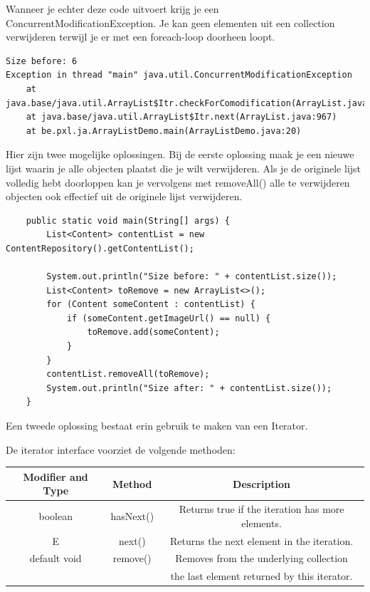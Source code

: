 \documentclass{tstextbook}
\begin{document}
Wanneer je echter deze code uitvoert krijg je een ConcurrentModificationException. Je kan geen elementen uit een collection verwijderen terwijl je er met een foreach-loop doorheen loopt.

\begin{verbatim}
Size before: 6
Exception in thread "main" java.util.ConcurrentModificationException
	at java.base/java.util.ArrayList$Itr.checkForComodification(ArrayList.java:1013)
	at java.base/java.util.ArrayList$Itr.next(ArrayList.java:967)
	at be.pxl.ja.ArrayListDemo.main(ArrayListDemo.java:20)
\end{verbatim}

Hier zijn twee mogelijke oplossingen. Bij de eerste oplossing maak je een nieuwe lijst waarin je alle objecten plaatst die je wilt verwijderen. Als je de originele lijst volledig hebt doorloppen kan je vervolgens met removeAll() alle te verwijderen objecten ook effectief uit de originele lijst verwijderen.

\begin{lstlisting}
	public static void main(String[] args) {
		List<Content> contentList = new ContentRepository().getContentList();

		System.out.println("Size before: " + contentList.size());
		List<Content> toRemove = new ArrayList<>();
		for (Content someContent : contentList) {
			if (someContent.getImageUrl() == null) {
				toRemove.add(someContent);
			}
		}
		contentList.removeAll(toRemove);
		System.out.println("Size after: " + contentList.size());
	}
\end{lstlisting}

Een tweede oplossing bestaat erin gebruik te maken van een Iterator.

De iterator interface voorziet de volgende methoden:

\vspace{2mm}
\begin{tabular}{| c | c |  c |} 
 \hline
Modifier and Type & Method	& Description \\
\hline
boolean & 	hasNext()	 &  Returns true if the iteration has more elements.\\
\hline
E & next() & Returns the next element in the iteration.\\
\hline
default void	& remove() & Removes from the underlying collection \\
 & & the last element returned by this iterator. \\
\hline
\end{tabular}
\vspace{4mm}
\end{document}
